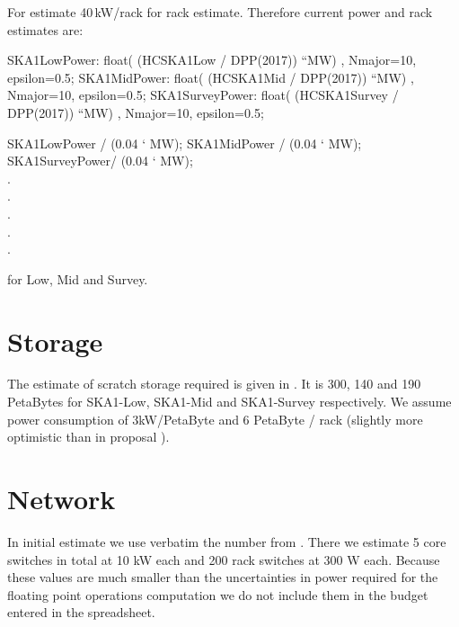\documentclass[useAMS,usenatbib,referee]{article}
\begin{document}
For estimate 40\,kW/rack for rack estimate. Therefore current power
and rack  estimates are:
\begin{maxima}[]
SKA1LowPower: float( (HCSKA1Low / DPP(2017)) ``MW) , Nmajor=10, epsilon=0.5;
SKA1MidPower: float( (HCSKA1Mid / DPP(2017)) ``MW) , Nmajor=10, epsilon=0.5;
SKA1SurveyPower: float( (HCSKA1Survey / DPP(2017)) ``MW) , Nmajor=10, epsilon=0.5;

SKA1LowPower  / (0.04 ` MW);
SKA1MidPower  / (0.04 ` MW);
SKA1SurveyPower/ (0.04 ` MW);
\maximaoutput*
{}\; \\
.\; \\
.\; \\
. \\
. \\
. \\
\end{maxima}
for Low, Mid and Survey. 


\section{Storage}

The estimate of scratch storage required is given in
\cite{SDPDataFlow}. It is 300, 140 and 190 PetaBytes for SKA1-Low,
SKA1-Mid and SKA1-Survey respectively. We assume power consumption
of 3kW/PetaByte and 6 PetaByte / rack (slightly more optimistic than
in proposal \cite{SDP-PROP-DR-001-1-ElemConc}).


\section{Network}

In initial estimate we use verbatim the number from
\cite{SDP-PROP-DR-001-1-ElemConc}. There we estimate 5 core switches
in total at 10 kW each and 200 rack switches at 300 W each. Because
these values are much smaller than the uncertainties in power required
for the floating point operations computation we do not include them
in the budget entered in the spreadsheet.

 

\end{document}
